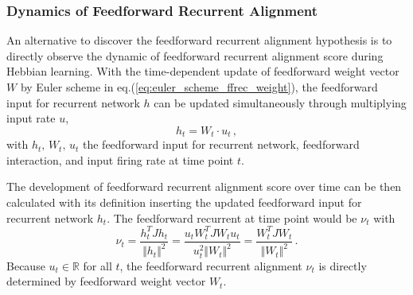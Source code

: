 \documentclass[11pt]{article}
\begin{document}
	\subsubsection{Dynamics of Feedforward Recurrent Alignment}
	
	An alternative to discover the feedforward recurrent alignment hypothesis is to directly observe the dynamic of feedforward recurrent alignment score during Hebbian learning. With the time-dependent update of feedforward weight vector $W$ by Euler scheme in  eq.(\ref{eq:euler_scheme_ffrec_weight}), the feedforward input for recurrent network $h$ can be updated simultaneously through multiplying input rate $u$, 
		\begin{equation} \label{eq:feedforward_input}
			h_t = W_t \cdot u_t \, ,
		\end{equation}
	with $h_t,\, W_t, \, u_t$ the feedforward input for recurrent network, feedforward interaction, and input firing rate at time point $t$. 
	
	The development of feedforward recurrent alignment score over time can be then calculated with its definition inserting the updated feedforward input for recurrent network $h_t$. The feedforward recurrent at time point would be $\nu_t$ with
		\begin{equation} \label{eq:ffrec_update}
			\nu_t = \frac{h_t^T J h_t}{\Vert h_t \Vert ^2} = \frac{u_t W_t^T J W_t u_t}{u_t^2 \Vert W_t \Vert ^2} = \frac{W_t^T J W_t}{\Vert W_t \Vert^2}\, . 
		\end{equation}
	Because $u_t \in \mathbb{R}$ for all $t$, the feedforward recurrent alignment $\nu_t$ is directly determined by feedforward weight vector $W_t$.  
	
\end{document}
